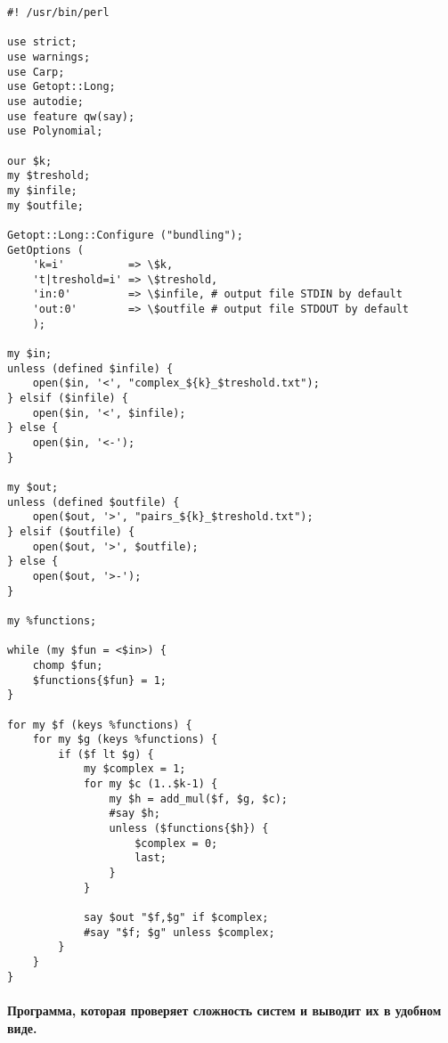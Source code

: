 \documentclass[bibliography=totoc, a4paper, 12pt]{extarticle}
\begin{document}
\lstset{language=Perl}
\begin{verbatim}
#! /usr/bin/perl

use strict;
use warnings;
use Carp;
use Getopt::Long;
use autodie;
use feature qw(say);
use Polynomial;

our $k;
my $treshold;
my $infile;
my $outfile;

Getopt::Long::Configure ("bundling");
GetOptions (
    'k=i'          => \$k,
    't|treshold=i' => \$treshold,
    'in:0'         => \$infile, # output file STDIN by default
    'out:0'        => \$outfile # output file STDOUT by default
    );

my $in;
unless (defined $infile) {
    open($in, '<', "complex_${k}_$treshold.txt");
} elsif ($infile) {
    open($in, '<', $infile);
} else {
    open($in, '<-');
}

my $out;
unless (defined $outfile) {
    open($out, '>', "pairs_${k}_$treshold.txt");
} elsif ($outfile) {
    open($out, '>', $outfile);
} else {
    open($out, '>-');
}

my %functions;

while (my $fun = <$in>) {
    chomp $fun;
    $functions{$fun} = 1;
}

for my $f (keys %functions) {
    for my $g (keys %functions) {
        if ($f lt $g) {
            my $complex = 1;
            for my $c (1..$k-1) {
                my $h = add_mul($f, $g, $c);
                #say $h;
                unless ($functions{$h}) {
                    $complex = 0;
                    last;
                }
            }

            say $out "$f,$g" if $complex;
            #say "$f; $g" unless $complex;
        }
    }
}
\end{verbatim}


\paragraph{Программа, которая проверяет сложность систем и выводит их в удобном
виде.}
\end{document}

